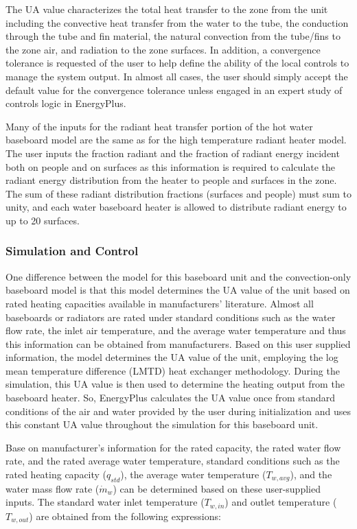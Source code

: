 The UA value characterizes the total heat transfer to the zone from the unit including the convective heat transfer from the water to the tube, the conduction through the tube and fin material, the natural convection from the tube/fins to the zone air, and radiation to the zone surfaces. In addition, a convergence tolerance is requested of the user to help define the ability of the local controls to manage the system output. In almost all cases, the user should simply accept the default value for the convergence tolerance unless engaged in an expert study of controls logic in EnergyPlus.

Many of the inputs for the radiant heat transfer portion of the hot water baseboard model are the same as for the high temperature radiant heater model. The user inputs the fraction radiant and the fraction of radiant energy incident both on people and on surfaces as this information is required to calculate the radiant energy distribution from the heater to people and surfaces in the zone. The sum of these radiant distribution fractions (surfaces and people) must sum to unity, and each water baseboard heater is allowed to distribute radiant energy to up to 20 surfaces.

\subsubsection{Simulation and Control}\label{simulation-and-control-2-000}

One difference between the model for this baseboard unit and the convection-only baseboard model is that this model determines the UA value of the unit based on rated heating capacities available in manufacturers' literature. Almost all baseboards or radiators are rated under standard conditions such as the water flow rate, the inlet air temperature, and the average water temperature and thus this information can be obtained from manufacturers. Based on this user supplied information, the model determines the UA value of the unit, employing the log mean temperature difference (LMTD) heat exchanger methodology.  During the simulation, this UA value is then used to determine the heating output from the baseboard heater. So, EnergyPlus calculates the UA value once from standard conditions of the air and water provided by the user during initialization and uses this constant UA value throughout the simulation for this baseboard unit.

Base on manufacturer's information for the rated capacity, the rated water flow rate, and the rated average water temperature, standard conditions such as the rated heating capacity (\({q_{std}}\)), the average water temperature (\({T_{w,avg}}\)), and the water mass flow rate (\(\dot m{}_w\)) can be determined based on these user-supplied inputs. The standard water inlet temperature (\({T_{w,in}}\)) and outlet temperature (\({T_{w,out}}\)) are obtained from the following expressions:

